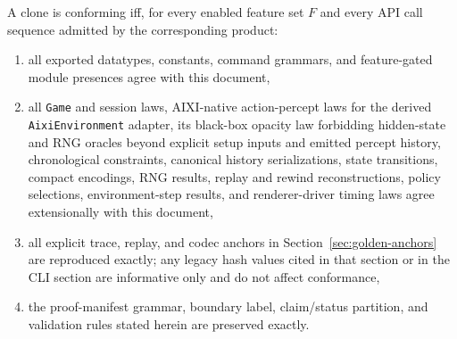 \documentclass[11pt]{article}
\newcommand{\code}[1]{\ifmmode\text{\texttt{#1}}\else\texttt{#1}\fi}
\begin{document}
A clone is conforming iff, for every enabled feature set $F$ and every API call sequence admitted by the corresponding product:
\begin{enumerate}
  \item all exported datatypes, constants, command grammars, and feature-gated module presences agree with this document,
  \item all \code{Game} and session laws, AIXI-native action-percept laws for the derived \code{AixiEnvironment} adapter, its black-box opacity law forbidding hidden-state and RNG oracles beyond explicit setup inputs and emitted percept history, chronological constraints, canonical history serializations, state transitions, compact encodings, RNG results, replay and rewind reconstructions, policy selections, environment-step results, and renderer-driver timing laws agree extensionally with this document,
  \item all explicit trace, replay, and codec anchors in Section~\ref{sec:golden-anchors} are reproduced exactly; any legacy hash values cited in that section or in the CLI section are informative only and do not affect conformance,
  \item the proof-manifest grammar, boundary label, claim/status partition, and validation rules stated herein are preserved exactly.
\end{enumerate}
\end{document}
